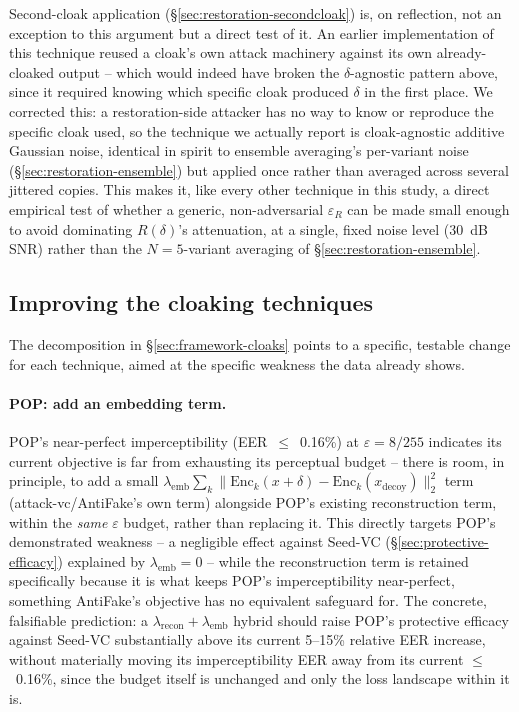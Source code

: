 \documentclass[11pt]{article}
\begin{document}
Second-cloak application (\S\ref{sec:restoration-secondcloak}) is, on
reflection, not an exception to this argument but a direct test of it.
An earlier implementation of this technique reused a cloak's own attack
machinery against its own already-cloaked output -- which would indeed
have broken the $\delta$-agnostic pattern above, since it required
knowing which specific cloak produced $\delta$ in the first place. We
corrected this: a restoration-side attacker has no way to know or
reproduce the specific cloak used, so the technique we actually report
is cloak-agnostic additive Gaussian noise, identical in spirit to
ensemble averaging's per-variant noise
(\S\ref{sec:restoration-ensemble}) but applied once rather than
averaged across several jittered copies. This makes it, like every
other technique in this study, a direct empirical test of whether a
generic, non-adversarial $\varepsilon_R$ can be made small enough to
avoid dominating $R(\delta)$'s attenuation, at a single, fixed noise
level (30~dB SNR) rather than the $N=5$-variant averaging of
\S\ref{sec:restoration-ensemble}.

\subsection{Improving the cloaking techniques}
\label{sec:framework-improve-cloaking}
The decomposition in \S\ref{sec:framework-cloaks} points to a specific,
testable change for each technique, aimed at the specific weakness the
data already shows.

\paragraph{POP: add an embedding term.} POP's near-perfect
imperceptibility (EER~$\leq$~0.16\%) at $\varepsilon=8/255$ indicates
its current objective is far from exhausting its perceptual budget --
there is room, in principle, to add a small
$\lambda_{\mathrm{emb}} \sum_k \|\mathrm{Enc}_k(x+\delta) -
\mathrm{Enc}_k(x_{\mathrm{decoy}})\|_2^2$ term (attack-vc/AntiFake's
own term) alongside POP's existing reconstruction term, within the
\emph{same} $\varepsilon$ budget, rather than replacing it. This
directly targets POP's demonstrated weakness -- a negligible effect
against Seed-VC (\S\ref{sec:protective-efficacy}) explained by
$\lambda_{\mathrm{emb}}=0$ -- while the reconstruction term is retained
specifically because it is what keeps POP's imperceptibility
near-perfect, something AntiFake's objective has no equivalent
safeguard for. The concrete, falsifiable prediction: a
$\lambda_{\mathrm{recon}} + \lambda_{\mathrm{emb}}$ hybrid should raise
POP's protective efficacy against Seed-VC substantially above its
current 5--15\% relative EER increase, without materially moving its
imperceptibility EER away from its current $\leq$~0.16\%, since the
budget itself is unchanged and only the loss landscape within it is.
\end{document}
